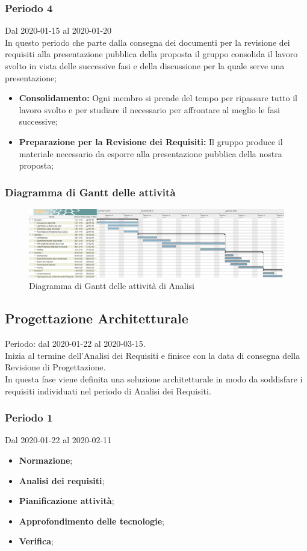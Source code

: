 \subsubsection{Periodo 4} 
Dal 2020-01-15 al 2020-01-20\\
In questo periodo che parte dalla consegna dei documenti per la revisione dei requisiti alla presentazione pubblica della proposta il gruppo consolida il lavoro svolto in vista delle successive fasi e della discussione per la quale serve una presentazione;
\begin{itemize}
	\item \textbf{Consolidamento:} Ogni membro si prende del tempo per ripassare tutto il lavoro svolto e per studiare il necessario per affrontare al meglio le fasi successive;
	\item \textbf{Preparazione per la Revisione dei Requisiti:} Il gruppo produce il materiale necessario da esporre alla presentazione pubblica della nostra proposta;
\end{itemize}
\subsubsection{Diagramma di Gantt delle attività}
\begin{figure}[h]
	\includegraphics[scale=0.45]{sezioni/DiagrammiGantt/Analisi.png}
	\caption{Diagramma di Gantt delle attività di Analisi}
\end{figure}


\subsection{Progettazione Architetturale}
Periodo: dal 2020-01-22 al 2020-03-15.
\\Inizia al termine dell'Analisi dei Requisiti e finisce con la data di consegna della Revisione di Progettazione.
\\In questa fase viene definita una soluzione architetturale in modo da soddisfare i requisiti individuati nel periodo di Analisi dei Requisiti.

\subsubsection{Periodo 1} 
Dal 2020-01-22 al 2020-02-11
\begin{itemize}
	\item \textbf{Normazione};
	\item \textbf{Analisi dei requisiti};
	\item \textbf{Pianificazione attività};
	\item \textbf{Approfondimento delle tecnologie};
	\item \textbf{Verifica};
\end{itemize}
